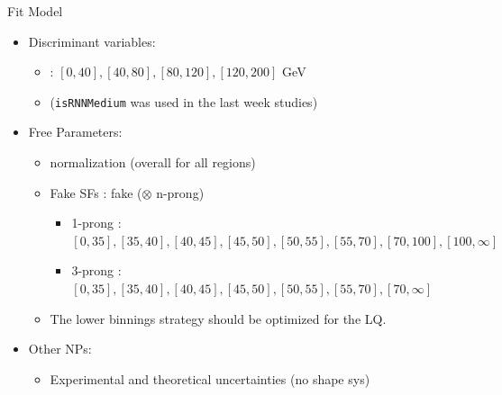 \documentclass[aspectratio=46, dvipdfmx, 10pt, t]{beamer} %
\begin{document}
\begin{frame}{Fit Model}
  \vspace{5mm}
  \begin{itemize}
    \item Discriminant variables:
      \begin{itemize}
        \item \mtw  : $[0,40], [40, 80], [80, 120], [120, 200]$ GeV
        \item ({\tt isRNNMedium} was used in the last week studies)
      \end{itemize}
      \vspace{5mm}

    \item Free Parameters:
      \begin{itemize}
        \item \ttbar normalization (overall for all regions)
        \item Fake SFs : fake \tauhad \ttbar (\pT $\otimes$ n-prong)
          \begin{itemize}
            \item 1-prong : $[0,35],[35,40],[40,45],[45,50],[50,55],[55,70],[70,100],[100,\infty]$
            \item 3-prong : $[0,35],[35,40],[40,45],[45,50],[50,55],[55,70],[70,\infty]$
          \end{itemize}
        \item The lower \pT binnings strategy should be optimized for the LQ.
      \end{itemize}
      \vspace{5mm}

    \item Other NPs:
      \begin{itemize}
        \item Experimental and theoretical uncertainties (no shape sys)
      \end{itemize}

  \end{itemize}
\end{frame}
\end{document}
